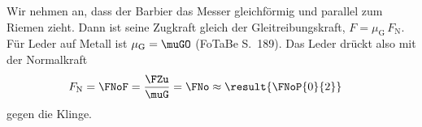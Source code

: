 Wir nehmen an, dass der Barbier das Messer gleichförmig und parallel zum Riemen zieht. Dann ist seine Zugkraft gleich der Gleitreibungskraft, $F = \mu_\mathrm{G}\,F_\mathrm{N}$. Für Leder auf Metall ist $\mu_\mathrm{G} = \muGO$ (FoTaBe S.~189). Das Leder drückt also mit der Normalkraft
\begin{align}
 F_\mathrm{N} &= \FNoF = \frac{\FZu}{\muG} = \FNo \approx \result{\FNoP{0}{2}}
\end{align}
gegen die Klinge.
